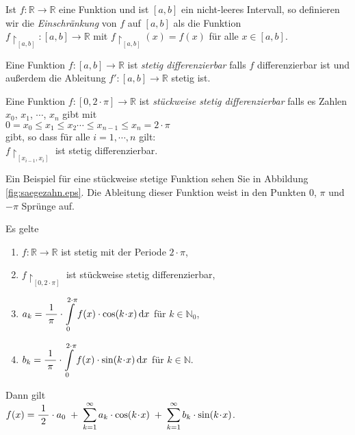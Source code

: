 \begin{Definition}
  Ist $f:\mathbb{R} \rightarrow \mathbb{R}$ eine Funktion und ist $[a,b]$ ein nicht-leeres
  Intervall, so definieren wir die \emph{Einschr\"ankung} von $f$ auf $[a,b]$ als die
  Funktion 
  \\[0.1cm]
  \hspace*{1.3cm}
  $f\!\upharpoonright_{[a,b]} : [a,b] \rightarrow \mathbb{R}$ \quad mit $f\!\upharpoonright_{[a,b]}(x) = f(x)$ f\"ur alle $x \in [a,b]$.
\end{Definition}

\begin{Definition}
  Eine Funktion $f:[a,b] \rightarrow \mathbb{R}$ ist \emph{stetig differenzierbar}
  falls $f$ differenzierbar ist und au{\ss}erdem die Ableitung $f':[a,b] \rightarrow
  \mathbb{R}$ stetig ist. 
\end{Definition}

\begin{Definition}
  Eine Funktion $f:[0,2\!\cdot\!\pi] \rightarrow \mathbb{R}$ ist \emph{st\"uckweise stetig differenzierbar} 
  falls es  Zahlen $x_0$, $x_1$, $\cdots$, $x_n$ gibt mit 
  \\[0.1cm]
  \hspace*{1.3cm}
  $0 = x_0\leq x_1 \leq x_2 \cdots \leq x_{n-1} \leq x_n = 2\!\cdot\!\pi$
  \\[0.1cm]
  gibt, so dass f\"ur alle $i=1,\cdots,n$ gilt: 
  \\[0.1cm]
  \hspace*{1.3cm}
  $f\!\upharpoonright_{[x_{i-1}, x_i]}$ ist stetig differenzierbar.  
\end{Definition}

Ein Beispiel f\"ur eine st\"uckweise stetige Funktion sehen Sie in Abbildung
\ref{fig:saegezahn.eps}.  Die Ableitung dieser Funktion weist in den Punkten $0$, $\pi$
und $-\pi$ Spr\"unge auf.

\begin{Satz} Es gelte
  \begin{enumerate}
  \item $f:\mathbb{R} \rightarrow \mathbb{R}$ ist  stetig mit der Periode $2\cdot\pi$,
  \item $f\!\upharpoonright_{[0,2\!\cdot\!\pi]}$ ist  st\"uckweise stetig differenzierbar,
  \item $a_k = \displaystyle\frac{\;\displaystyle1\;}{\;\displaystyle\pi\;} \cdot\int\limits_0^{2\cdot\pi}f(x)\cdot\cos(k\!\cdot\!x)\,\textrm{d} x$ \quad f\"ur $k \in \mathbb{N}_0$,
  \item $b_k = \displaystyle\frac{\;\displaystyle1\;}{\;\displaystyle\pi\;}\cdot\int\limits_0^{2\cdot\pi}f(x)\cdot\sin(k\!\cdot\!x)\,\textrm{d} x$ \quad f\"ur $k \in \mathbb{N}$.  
  \end{enumerate}
  Dann gilt \\[0.1cm]
  \hspace*{1.3cm}
  $f(x) = \displaystyle\frac{\;\displaystyle1\;}{\;\displaystyle2\;}\cdot a_0 \;+\; \sum\limits_{k=1}^\infty a_k\cdot \cos(k\!\cdot\!x) \;+\;
                                      \sum\limits_{k=1}^\infty b_k\cdot \sin(k\!\cdot\!x)$.
\end{Satz}

